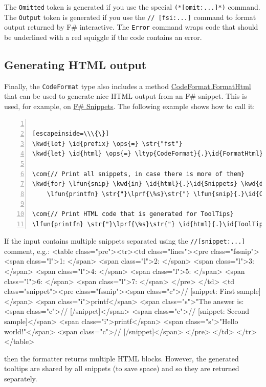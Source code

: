 \documentclass{article}
\newcommand{\id}[1]{\textcolor{black}{#1}}
\newcommand{\com}[1]{\textcolor{officegreen}{#1}}
\newcommand{\kwd}[1]{\textcolor{navy}{#1}}
\newcommand{\ops}[1]{\textcolor{purple}{#1}}
\newcommand{\str}[1]{\textcolor{olive}{#1}}
\begin{document}
The \texttt{Omitted} token is generated if you use the special \texttt{(*[omit:...]*)} command.
The \texttt{Output} token is generated if you use the \texttt{// [fsi:...]} command to format
output returned by F\# interactive. The \texttt{Error} command wraps code that should be
underlined with a red squiggle if the code contains an error.
\subsection*{Generating HTML output}



Finally, the \texttt{CodeFormat} type also includes a method \href{https://fsprojects.github.io/FSharp.Formatting/reference/fsharp-formatting-codeformat-codeformat.html\#FormatHtml}{CodeFormat.FormatHtml} that can be used
to generate nice HTML output from an F\# snippet. This is used, for example, on
\href{http://www.fssnip.net}{F\# Snippets}. The following example shows how to call it:
\begin{lstlisting}[numbers=left]

[escapeinside=\\\{\}]
\kwd{let} \id{prefix} \ops{=} \str{"fst"}
\kwd{let} \id{html} \ops{=} \ltyp{CodeFormat}{.}\id{FormatHtml}{(}\id{snippets}{,} \id{prefix}{)}

\com{// Print all snippets, in case there is more of them}
\kwd{for} \lfun{snip} \kwd{in} \id{html}{.}\id{Snippets} \kwd{do}
    \lfun{printfn} \str{"}\lprf{\%s}\str{"} \lfun{snip}{.}\id{Content}

\com{// Print HTML code that is generated for ToolTips}
\lfun{printfn} \str{"}\lprf{\%s}\str{"} \id{html}{.}\id{ToolTip}

\end{lstlisting}



If the input contains multiple snippets separated using the \texttt{//[snippet:...]} comment, e.g.:
<table class="pre"><tr><td class="lines"><pre class="fssnip">
<span class="l">1: </span>
<span class="l">2: </span>
<span class="l">3: </span>
<span class="l">4: </span>
<span class="l">5: </span>
<span class="l">6: </span>
<span class="l">7: </span>
</pre>
</td>
<td class="snippet"><pre class="fssnip"><span class="c">// [snippet: First sample]</span>
<span class="i">printf</span> <span class="s">"The answer is: %
<span class="c">// [/snippet]</span>
<span class="c">// [snippet: Second sample]</span>
<span class="i">printf</span> <span class="s">"Hello world!"</span>
<span class="c">// [/snippet]</span>
</pre>
</td>
</tr>
</table>


then the formatter returns multiple HTML blocks. However, the generated tooltips
are shared by all snippets (to save space) and so they are returned separately.
\end{document}
